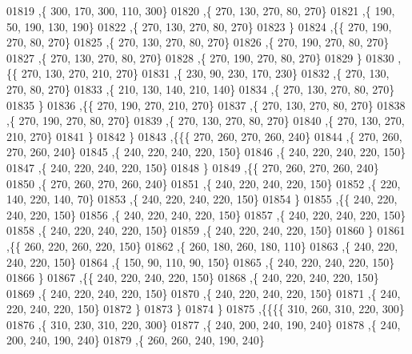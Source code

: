 \begin{DoxyCode}
01819     ,\{   300,   170,   300,   110,   300\}
01820     ,\{   270,   130,   270,    80,   270\}
01821     ,\{   190,    50,   190,   130,   190\}
01822     ,\{   270,   130,   270,    80,   270\}
01823     \}
01824    ,\{\{   270,   190,   270,    80,   270\}
01825     ,\{   270,   130,   270,    80,   270\}
01826     ,\{   270,   190,   270,    80,   270\}
01827     ,\{   270,   130,   270,    80,   270\}
01828     ,\{   270,   190,   270,    80,   270\}
01829     \}
01830    ,\{\{   270,   130,   270,   210,   270\}
01831     ,\{   230,    90,   230,   170,   230\}
01832     ,\{   270,   130,   270,    80,   270\}
01833     ,\{   210,   130,   140,   210,   140\}
01834     ,\{   270,   130,   270,    80,   270\}
01835     \}
01836    ,\{\{   270,   190,   270,   210,   270\}
01837     ,\{   270,   130,   270,    80,   270\}
01838     ,\{   270,   190,   270,    80,   270\}
01839     ,\{   270,   130,   270,    80,   270\}
01840     ,\{   270,   130,   270,   210,   270\}
01841     \}
01842    \}
01843   ,\{\{\{   270,   260,   270,   260,   240\}
01844     ,\{   270,   260,   270,   260,   240\}
01845     ,\{   240,   220,   240,   220,   150\}
01846     ,\{   240,   220,   240,   220,   150\}
01847     ,\{   240,   220,   240,   220,   150\}
01848     \}
01849    ,\{\{   270,   260,   270,   260,   240\}
01850     ,\{   270,   260,   270,   260,   240\}
01851     ,\{   240,   220,   240,   220,   150\}
01852     ,\{   220,   140,   220,   140,    70\}
01853     ,\{   240,   220,   240,   220,   150\}
01854     \}
01855    ,\{\{   240,   220,   240,   220,   150\}
01856     ,\{   240,   220,   240,   220,   150\}
01857     ,\{   240,   220,   240,   220,   150\}
01858     ,\{   240,   220,   240,   220,   150\}
01859     ,\{   240,   220,   240,   220,   150\}
01860     \}
01861    ,\{\{   260,   220,   260,   220,   150\}
01862     ,\{   260,   180,   260,   180,   110\}
01863     ,\{   240,   220,   240,   220,   150\}
01864     ,\{   150,    90,   110,    90,   150\}
01865     ,\{   240,   220,   240,   220,   150\}
01866     \}
01867    ,\{\{   240,   220,   240,   220,   150\}
01868     ,\{   240,   220,   240,   220,   150\}
01869     ,\{   240,   220,   240,   220,   150\}
01870     ,\{   240,   220,   240,   220,   150\}
01871     ,\{   240,   220,   240,   220,   150\}
01872     \}
01873    \}
01874   \}
01875  ,\{\{\{\{   310,   260,   310,   220,   300\}
01876     ,\{   310,   230,   310,   220,   300\}
01877     ,\{   240,   200,   240,   190,   240\}
01878     ,\{   240,   200,   240,   190,   240\}
01879     ,\{   260,   260,   240,   190,   240\}

\end{DoxyCode}
